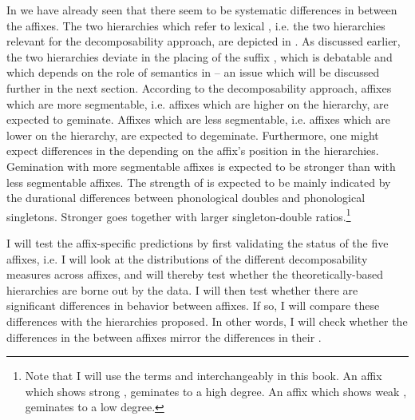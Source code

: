  In  we have already seen that there seem to be systematic differences in  between the affixes. 
The two  hierarchies which refer to lexical , i.e. the two hierarchies relevant for the decomposability approach, are depicted in . As discussed earlier, the two hierarchies deviate in the placing of the suffix , which is debatable and which depends on the role of semantics in  --  an issue which will be discussed further in the next section.
According to the decomposability approach, affixes which are more segmentable, i.e. affixes which are higher on the  hierarchy, are expected to geminate. Affixes which are less segmentable, i.e. affixes which are lower on the hierarchy, are expected to degeminate. Furthermore, one might expect differences in the  depending on the affix's position in the hierarchies. Gemination with more segmentable affixes is expected to be stronger than  with less segmentable affixes. The strength of  is expected to be mainly indicated by the durational differences between phonological doubles and phonological singletons. Stronger  goes together with larger singleton-double ratios.\footnote{Note that I will use the terms  and  interchangeably in this book. An affix which shows strong , geminates to a high degree. An affix which shows weak , geminates to a low degree.}




I will test the affix-specific  predictions by first validating the  status of the five affixes, i.e. I will look at the distributions of the different decomposability measures across affixes, and will thereby test whether the theoretically-based hierarchies are borne out by the data. I will then test whether there are significant differences in  behavior between affixes. If so, I will compare these differences with the  hierarchies proposed. In other words, I will check whether  the differences in the  between affixes mirror the differences in their .

